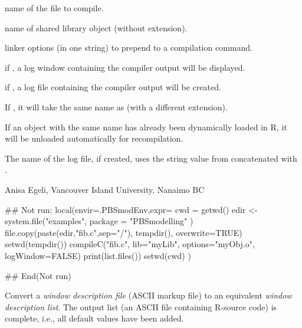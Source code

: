 \documentclass[letterpaper]{book}
\begin{document}
%
\begin{Arguments}
\begin{ldescription}
\item[\code{file}] name of the file to compile.
\item[\code{lib}] name of shared library object (without extension).
\item[\code{options}] linker options (in one string) to prepend to a compilation command.
\item[\code{logWindow}] if , a log window containing the compiler output will be displayed.
\item[\code{logFile}] if , a log file containing the compiler output will be created.
\end{ldescription}
\end{Arguments}
%
\begin{Details}\relax
If , it will take the same name as  (with a different extension).

If an object with the same name has already been dynamically loaded in R, 
it will be unloaded automatically for recompilation.

The name of the log file, if created, uses the string value from  
concatenated with .
\end{Details}
%
\begin{Author}\relax
Anisa Egeli, Vancouver Island University, Nanaimo BC
\end{Author}
%
\begin{SeeAlso}\relax
{}
\end{SeeAlso}
%
\begin{Examples}
\begin{ExampleCode}
## Not run: 
local(envir=.PBSmodEnv,expr={
  cwd = getwd()
  edir <- system.file("examples", package = "PBSmodelling" )
  file.copy(paste(edir,"fib.c",sep="/"), tempdir(), overwrite=TRUE)
  setwd(tempdir())
  compileC("fib.c", lib="myLib", options="myObj.o", logWindow=FALSE)
  print(list.files())
  setwd(cwd)
})

## End(Not run)
\end{ExampleCode}
\end{Examples}
%
\begin{Description}\relax
Convert a \emph{window description file} (ASCII markup file) to an equivalent 
\emph{window description list}. The output list (an ASCII file containing R-source code) 
is complete, i.e., all default values have been added.
\end{Description}
\end{document}
